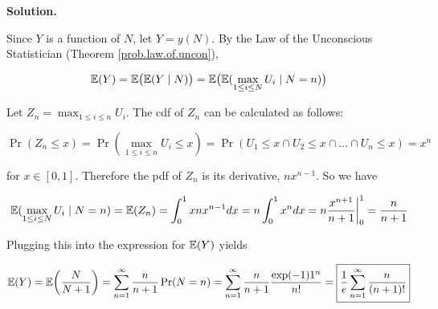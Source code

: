 
\textbf{Solution.} 

Since \(Y\) is a function of \(N\), let \(Y = y(N)\). By the Law of the Unconscious Statistician (Theorem \ref{prob.law.of.uncon}),

\[
\E(Y) = \E \big( \E( Y \mid N) \big) = \E \big( \E( \max_{1 \leq i \leq N} U_i \mid N = n ) \big) 
\]

Let \( Z_n = \max_{1 \leq i \leq n} U_i  \). The cdf of \(Z_n\) can be calculated as follows:

\[
\Pr(Z_n \leq x) = \Pr(  \max_{1 \leq i \leq n} U_i  \leq x) = \Pr(U_1 \leq x \cap U_2 \leq x \cap \ldots \cap U_n \leq x) = x^n
\]

for \(x \in [0, 1]\). Therefore the pdf of \(Z_n\) is its derivative, \(nx^{n-1}\). So we have

\[
 \E( \max_{1 \leq i \leq N} U_i \mid N = n ) = \E(Z_n) = \int_{0}^1 x n x^{n-1} dx = n \int_0^1 x^n dx = n \frac{x^{n+1}}{n+1} \bigg|_0^1 = \frac{n}{n+1}
\]

Plugging this into the expression for \(\E(Y)\) yields

\[
\E(Y) = \E \bigg( \frac{N}{N+1} \bigg) = \sum_{n=1}^\infty \frac{n}{n+1} \Pr(N = n) = \sum_{n=1}^\infty \frac{n}{n+1} \frac{\exp(-1)1^n}{n!} = \boxed{ \frac{1}{e} \sum_{n=1}^\infty \frac{n}{(n+1)!}}
\]


%
%
%
%


